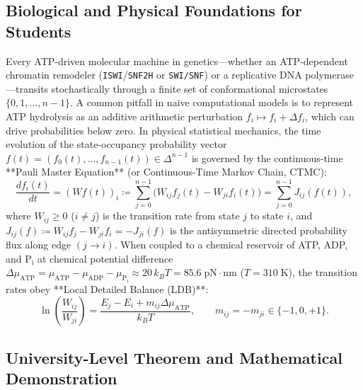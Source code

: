 \documentclass[11pt,a4paper]{article}
\theoremstyle{definition}
\theoremstyle{remark}
\begin{document}
\subsection{Biological and Physical Foundations for Students}
Every ATP-driven molecular machine in genetics---whether an ATP-dependent chromatin remodeler (\texttt{ISWI}/\texttt{SNF2H} or \texttt{SWI/SNF}) or a replicative DNA polymerase---transits stochastically through a finite set of conformational microstates $\{0, 1, \dots, n-1\}$. A common pitfall in naive computational models is to represent ATP hydrolysis as an additive arithmetic perturbation $f_i \mapsto f_i + \Delta f_i$, which can drive probabilities below zero. In physical statistical mechanics, the time evolution of the state-occupancy probability vector $f(t) = (f_0(t), \dots, f_{n-1}(t)) \in \Delta^{n-1}$ is governed by the continuous-time **Pauli Master Equation** (or Continuous-Time Markov Chain, CTMC):
\begin{equation}
  \frac{df_i(t)}{dt} = (Wf(t))_i \coloneqq \sum_{j=0}^{n-1} \bigl(W_{ij} f_j(t) - W_{ji} f_i(t)\bigr) = \sum_{j=0}^{n-1} J_{ij}(f(t)),
  \label{eq:sec1_pauli}
\end{equation}
where $W_{ij} \ge 0$ ($i \neq j$) is the transition rate from state $j$ to state $i$, and $J_{ij}(f) \coloneqq W_{ij}f_j - W_{ji}f_i = -J_{ji}(f)$ is the antisymmetric directed probability flux along edge $(j \to i)$. When coupled to a chemical reservoir of ATP, ADP, and $\mathrm{P_i}$ at chemical potential difference $\Delta\mu_{\mathrm{ATP}} = \mu_{\mathrm{ATP}} - \mu_{\mathrm{ADP}} - \mu_{\mathrm{P_i}} \approx 20\,k_B T = 85.6\;\mathrm{pN\cdot nm}$ ($T = 310\;\mathrm{K}$), the transition rates obey **Local Detailed Balance (LDB)**:
\begin{equation}
  \ln\!\left(\frac{W_{ij}}{W_{ji}}\right) = \frac{E_j - E_i + m_{ij}\Delta\mu_{\mathrm{ATP}}}{k_B T}, \qquad m_{ij} = -m_{ji} \in \{-1, 0, +1\}.
\end{equation}

\subsection{University-Level Theorem and Mathematical Demonstration}
\end{document}
